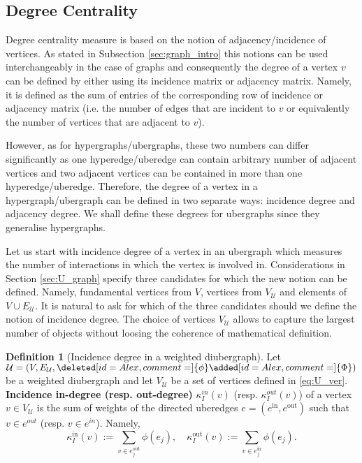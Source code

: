 \documentclass[a4paper,12pt]{article}
\theoremstyle{definition}
\newtheorem{definition}{Definition}%
\theoremstyle{remark}
\newcommand{\aadd}[2][]{\added[id=Alex,comment=#1]{#2}}
\newcommand{\adel}[2][]{\deleted[id=Alex,comment=#1]{#2}}
\newcommand{\mU}{\mathcal{U}}
\begin{document}
\subsection{Degree Centrality}

Degree centrality measure is based on the notion of adjacency/incidence of vertices. As stated in Subsection \ref{sec:graph_intro} this notions can be used interchangeably in the case of graphs and consequently the degree of a vertex $v$ can be defined by either using its incidence matrix or adjacency matrix. Namely, it is defined as the sum of entries of the corresponding row of incidence or adjacency matrix (i.e. the number of edges that are incident to $v$ or equivalently the number of vertices that are adjacent to $v$).

However, as for hypergraphs/ubergraphs, these two numbers can differ significantly as one hyperedge/uberedge can contain arbitrary number of adjacent vertices and two adjacent vertices can be contained in more than one hyperedge/uberedge. Therefore, the degree of a vertex in a hypergraph/ubergraph can be defined in two separate ways: incidence degree and adjacency degree. We shall define these degrees for ubergraphs since they generalise hypergraphs. 

Let us start with incidence degree of a vertex in an ubergraph which measures the number of interactions in which the vertex is involved in. Considerations in Section \ref{sec:U_graph} specify three candidates for which the new notion can be defined. Namely, fundamental vertices from $V$, vertices from $V_{\mU}$ and elements of $V\cup E_{\mU}$. It is natural to ask for which of the three candidates should we define the notion of incidence degree. The choice of vertices $V_{\mU}$ allows to capture the largest number of objects without loosing the coherence of mathematical definition. 
\begin{definition}[Incidence degree in a weighted diubergraph]\label{def:incidence-deg}
    Let $\mathcal{U}=(V,E_{\mathcal{U}},\adel{\phi}\aadd{\Phi})$ be a weighted diubergraph and let $V_{\mU}$ be a set of vertices defined in \eqref{eq:U_ver}. \textbf{Incidence in-degree (resp. out-degree)} $ \kappa_{I}^{in}(v)$ (resp. $ \kappa_{I}^{out}(v)$) of a vertex $v \in V_{\mU}$ is the sum of weights of the directed uberedges $e=(e^{\mathrm{in}}, e^{\mathrm{out}} )$ such that $v \in e^{out}$ (resp. $v \in e^{in}$). Namely,
    \begin{equation} \label{eq:incidence-deg}
    \kappa_{I}^{\mathrm{in}}(v):=\sum_{v \in e_{j}^{\mathrm{out}} }\phi(e_{j}), \quad \kappa_{I}^{\mathrm{out}}(v):=\sum_{v \in e_{j}^{\mathrm{in}}}\phi(e_{j}).
\end{equation}
\end{definition}
\end{document}

